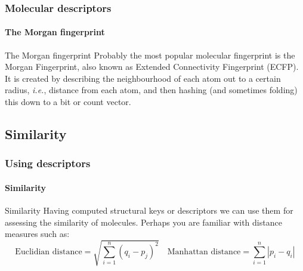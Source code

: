 \documentclass[aspectratio=169,dvipsnames]{beamer}
\begin{document}
        \begin{frame}
        \frametitle{Molecular descriptors}
        \framesubtitle{The Morgan fingerprint}
        \centering
{}

        \begin{block}{The Morgan fingerprint}
            Probably the most popular molecular fingerprint is the Morgan
            Fingerprint, also known as \alert{Extended Connectivity Fingerprint
            (ECFP)}. It is created by describing the neighbourhood of each atom
            out to a certain radius, \textit{i.e.}, distance from each atom, and
            then hashing (and sometimes folding) this down to a bit or count
            vector.
        \end{block}
    \end{frame}

\subsection{Similarity}

    \begin{frame}
        \frametitle{Using descriptors}
        \framesubtitle{Similarity}

        \begin{block}{Similarity}
            Having computed structural keys or descriptors we can use them for assessing the similarity of molecules.
            Perhaps you are familiar with distance measures such as:
            {\small
            \begin{equation*}
                \mbox{Euclidian distance}=\sqrt{\sum^n_{i=1}(q_i-p_j)^2} \quad 
                \mbox{Manhattan distance}=\sum_{i=1}^n{|p_i-q_i|}
            \end{equation*}}
        \end{block}
    \end{frame}
\end{document}

